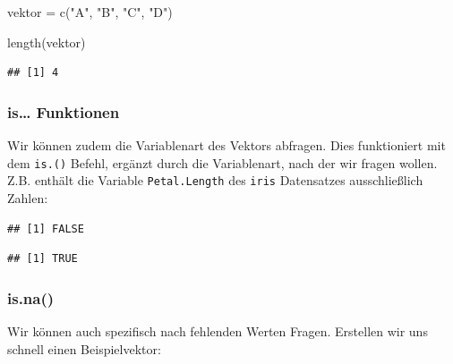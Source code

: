 \documentclass[
]{book}
\newenvironment{Shaded}{\begin{snugshade}}{\end{snugshade}}
\newcommand{\FunctionTok}[1]{\textcolor[rgb]{0.00,0.00,0.00}{#1}}
\newcommand{\NormalTok}[1]{#1}
\newcommand{\OtherTok}[1]{\textcolor[rgb]{0.56,0.35,0.01}{#1}}
\newcommand{\SpecialCharTok}[1]{\textcolor[rgb]{0.00,0.00,0.00}{#1}}
\newcommand{\StringTok}[1]{\textcolor[rgb]{0.31,0.60,0.02}{#1}}
\begin{document}
\begin{Shaded}
\begin{Highlighting}[]
\NormalTok{vektor }\OtherTok{=} \FunctionTok{c}\NormalTok{(}\StringTok{"A"}\NormalTok{, }\StringTok{"B"}\NormalTok{, }\StringTok{"C"}\NormalTok{, }\StringTok{"D"}\NormalTok{)}

\FunctionTok{length}\NormalTok{(vektor)}
\end{Highlighting}
\end{Shaded}

\begin{verbatim}
## [1] 4
\end{verbatim}

\hypertarget{is-funktionen}{%
\subsubsection{is\ldots{} Funktionen}\label{is-funktionen}}

Wir können zudem die Variablenart des Vektors abfragen. Dies funktioniert mit dem \texttt{is.()} Befehl, ergänzt durch die Variablenart, nach der wir fragen wollen. Z.B. enthält die Variable \texttt{Petal.Length} des \texttt{iris} Datensatzes ausschließlich Zahlen:

\begin{Shaded}
\end{Shaded}

\begin{verbatim}
## [1] FALSE
\end{verbatim}

\begin{Shaded}
\end{Shaded}

\begin{verbatim}
## [1] TRUE
\end{verbatim}

\hypertarget{is.na}{%
\subsubsection{is.na()}\label{is.na}}

Wir können auch spezifisch nach fehlenden Werten Fragen. Erstellen wir uns schnell einen Beispielvektor:
\end{document}
